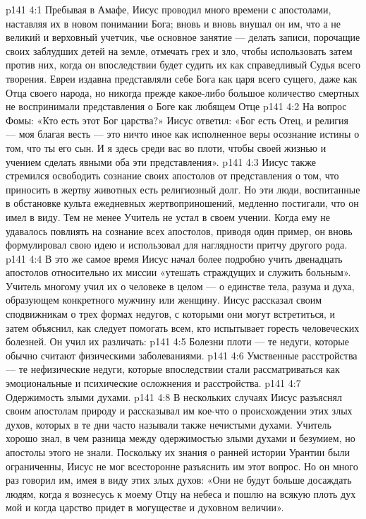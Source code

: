 \vs p141 4:1 Пребывая в Амафе, Иисус проводил много времени с апостолами, наставляя их в новом понимании Бога; вновь и вновь внушал он им, что  а не великий и верховный учетчик, чье основное занятие --- делать записи, порочащие своих заблудших детей на земле, отмечать грех и зло, чтобы использовать затем против них, когда он впоследствии будет судить их как справедливый Судья всего творения. Евреи издавна представляли себе Бога как царя всего сущего, даже как Отца своего народа, но никогда прежде какое\hyp{}либо большое количество смертных не воспринимали представления о Боге как любящем Отце 
\vs p141 4:2 На вопрос Фомы: «Кто есть этот Бог царства?» Иисус ответил: «Бог есть  Отец, и религия --- моя благая весть --- это ничто иное как исполненное веры осознание истины о том, что ты его сын. И я здесь среди вас во плоти, чтобы своей жизнью и учением сделать явными оба эти представления».
\vs p141 4:3 Иисус также стремился освободить сознание своих апостолов от представления о том, что приносить в жертву животных есть религиозный долг. Но эти люди, воспитанные в обстановке культа ежедневных жертвоприношений, медленно постигали, что он имел в виду. Тем не менее Учитель не устал в своем учении. Когда ему не удавалось повлиять на сознание всех апостолов, приводя один пример, он вновь формулировал свою идею и использовал для наглядности притчу другого рода.
\vs p141 4:4 \pc В это же самое время Иисус начал более подробно учить двенадцать апостолов относительно их миссии «утешать страждущих и служить больным». Учитель многому учил их о человеке в целом --- о единстве тела, разума и духа, образующем конкретного мужчину или женщину. Иисус рассказал своим сподвижникам о трех формах недугов, с которыми они могут встретиться, и затем объяснил, как следует помогать всем, кто испытывает горесть человеческих болезней. Он учил их различать:
\vs p141 4:5 \bibnobreakspace Болезни плоти --- те недуги, которые обычно считают физическими заболеваниями.
\vs p141 4:6 \bibnobreakspace Умственные расстройства --- те нефизические недуги, которые впоследствии стали рассматриваться как эмоциональные и психические осложнения и расстройства.
\vs p141 4:7 \bibnobreakspace Одержимость злыми духами.
\vs p141 4:8 \pc В нескольких случаях Иисус разъяснял своим апостолам природу и рассказывал им кое\hyp{}что о происхождении этих злых духов, которых в те дни часто называли также нечистыми духами. Учитель хорошо знал, в чем разница между одержимостью злыми духами и безумием, но апостолы этого не знали. Поскольку их знания о ранней истории Урантии были ограниченны, Иисус не мог всесторонне разъяснить им этот вопрос. Но он много раз говорил им, имея в виду этих злых духов: «Они не будут больше досаждать людям, когда я вознесусь к моему Отцу на небеса и пошлю на всякую плоть дух мой и когда царство придет в могуществе и духовном величии».
